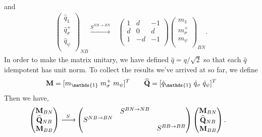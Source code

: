 \documentclass[12pt,a4paper]{article}
\newcounter{arrow}
\newcommand{\unit}{\mathds{1}}
\begin{document}
and
\begin{align}
\left( \begin{matrix}
\hat{q}_\unit\\
\hat{q}_\sigma^+\\
\hat{q}_\psi\\
\end{matrix} \right)_{NB} 
\xrightarrow{S^{NB \rightarrow BN}} & \left( \begin{matrix}
1&d&-1\\ %
d&0&d\\
1&-d&-1\\ %
\end{matrix} \right)
\left( \begin{matrix}
m_\unit\\
m_\sigma^+\\
m_\psi\\
\end{matrix} \right)_{BN}.
\end{align}
In order to make the matrix unitary, we have defined $\hat{q} = q/\sqrt{2}$ so that each $\hat{q}$ idempotent has unit norm.
To collect the results we've arrived at so far, we define
\begin{align}
{\bf M} = [ m_\unit \;  m_\sigma^+\;  m_\psi]^T \qquad \widehat{{\bf Q} }= [\hat{q}_\unit \; \hat{q}_\sigma \; \hat{q}_\psi ]^T
\end{align}
Then we have,
\begin{align}
\left( \begin{matrix}
{\bf M}_{BN}\\
\widehat{{\bf Q} }_{NB}\\
{\bf M}_{BB}\\
\end{matrix} \right)
\xrightarrow{\;\; S \; \; } & \left( \begin{matrix}
&S^{BN \rightarrow NB}&\\
S^{NB \rightarrow BN}&&\\
&&S^{BB \rightarrow BB}\\
\end{matrix} \right)
\left( \begin{matrix}
{\bf M}_{BN}\\
\widehat{{\bf Q} }_{NB}\\
{\bf M}_{BB}\\
\end{matrix} \right).
\end{align}
\end{document}

